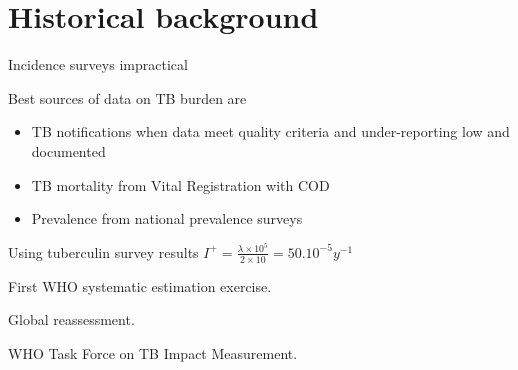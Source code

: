 \section{Historical background}

Incidence surveys impractical\cite{18201929}

Best sources of data on TB burden are 
\begin{itemize}
\item TB notifications when data meet quality criteria and under-reporting low and documented
\item TB mortality from Vital Registration with COD
\item Prevalence from national prevalence surveys
\end{itemize}

Using tuberculin survey results\cite{Styblo1985}
$I^+ = \frac{\lambda \times 10^5}{2 \times 10} = 50.10^{-5} y^{-1}$

First WHO systematic estimation exercise\cite{1600578}.

Global reassessment\cite{10517722}.

WHO Task Force on TB Impact Measurement\cite{18201929}.



  
  
  
  
  
  
  
  
  
  
  